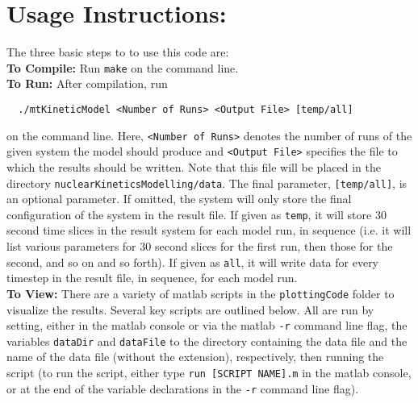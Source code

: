 \documentclass{article}
\begin{document}
\section{Usage Instructions:}
  The three basic steps to to use this code are:\\
  \textbf{To Compile:} Run \texttt{make} on the command line.\\
  \textbf{To Run:} After compilation, run
  \begin{verbatim}
  ./mtKineticModel <Number of Runs> <Output File> [temp/all]
  \end{verbatim}
  on the command line. Here, \texttt{<Number of Runs>} denotes the number of
  runs of the given system the model should produce and \texttt{<Output File>}
  specifies the file to which the results should be written. Note that this file
  will be placed in the directory \texttt{nuclearKineticsModelling/data}. The
  final parameter, \texttt{[temp/all]}, is an optional parameter. If omitted,
  the system will only store the final configuration of the system in the result
  file. If given as \texttt{temp}, it will store 30 second time slices in the
  result system for each model run, in sequence (i.e. it will list various
  parameters for 30 second slices for the first run, then those for the second,
  and so on and so forth). If given as \texttt{all}, it will write data for
  every timestep in the result file, in sequence, for each model run. \\
  \textbf{To View: } There are a variety of matlab scripts in the
  \texttt{plottingCode} folder to visualize the results. Several key scripts are
  outlined below. All are run by setting, either in the matlab console or via
  the matlab \texttt{-r} command line flag, the variables \texttt{dataDir} and
  \texttt{dataFile} to the directory containing the data file and the name of
  the data file (without the extension), respectively, then running the script
  (to run the script, either type \texttt{run [SCRIPT NAME].m} in the matlab
  console, or at the end of the variable declarations in the \texttt{-r} command
  line flag).
\end{document}
